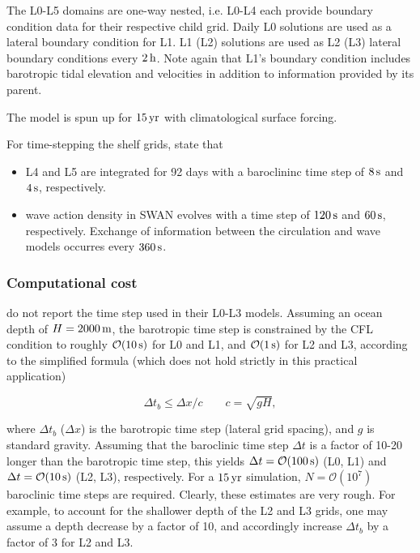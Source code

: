 \documentclass[12pt,a4paper]{article}
\begin{document}
The L0-L5 domains are one-way nested, i.e. L0-L4 each provide boundary condition data for their respective child grid. Daily L0 solutions are used as a lateral boundary condition for L1. L1 (L2) solutions are used as L2 (L3) lateral boundary conditions every $2\,\rm h$. Note again that L1's boundary condition includes barotropic tidal elevation and velocities in addition to information provided by its parent.

The model is spun up for $15\,\rm yr$ with climatological surface forcing.


For time-stepping the shelf grids, \cite{kumar2015midshelf} state that

\begin{itemize}
	\item L4 and L5 are integrated for 92 days with a baroclininc time step of $8\,\rm s$ and $4\,\rm s$, respectively.
	\item wave action density in SWAN evolves with a time step of $120\,\rm s$ and $60\,\rm s$, respectively. Exchange of information between the circulation and wave models occurres every $360\,\rm s$.
\end{itemize}


\subsubsection{Computational cost}

\cite{kumar2015midshelf} do not report the time step used in their L0-L3 models. Assuming an ocean depth of $H=2000\,\rm m$, the barotropic time step is constrained by the CFL condition to roughly $\mathcal{O}(10\,\rm s)$ for L0 and L1, and $\mathcal{O}(1\,\rm s)$ for L2 and L3, according to the simplified formula (which does not hold strictly in this practical application)

\begin{equation}
\Delta t_{b}\leq\Delta x/c \qquad c=\sqrt{gH},
\end{equation}

where $\Delta t_b$ ($\Delta x$) is the barotropic time step (lateral grid spacing), and $g$ is standard gravity. Assuming that the baroclinic time step $\Delta t$ is a factor of 10-20 longer than the barotropic time step, this yields $\Delta t=\mathcal{O}(100\,\rm s)$ (L0, L1) and $\Delta t= \mathcal{O}(10\,\rm s)$ (L2, L3), respectively. For a $15\,\rm yr$ simulation, $N=\mathcal{O}(10^7)$ baroclinic time steps are required. Clearly, these estimates are very rough. For example, to account for the shallower depth of the L2 and L3 grids,  one may assume a depth decrease by a factor of 10, and accordingly increase $\Delta t_b$ by a factor of 3 for L2 and L3. 
\end{document}
